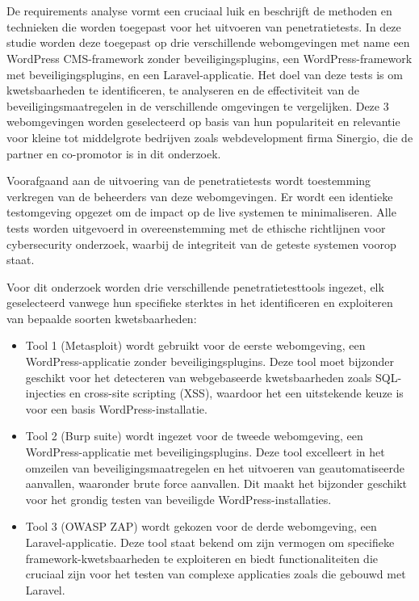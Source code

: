 \section{}
De requirements analyse vormt een cruciaal luik en beschrijft de methoden en technieken die worden toegepast 
voor het uitvoeren van penetratietests. In deze studie worden deze toegepast op drie 
verschillende webomgevingen met name een WordPress CMS-framework zonder beveiligingsplugins, een WordPress-framework met 
beveiligingsplugins, en een Laravel-applicatie. Het doel van deze tests is om kwetsbaarheden te identificeren, te 
analyseren en de effectiviteit van de beveiligingsmaatregelen in de verschillende omgevingen te vergelijken.
Deze 3 webomgevingen worden geselecteerd op basis van hun populariteit en relevantie voor kleine tot middelgrote bedrijven 
zoals webdevelopment firma Sinergio, die de partner en co-promotor is in dit onderzoek.

Voorafgaand aan de uitvoering van de penetratietests wordt toestemming verkregen van de beheerders van deze 
webomgevingen. Er wordt een identieke testomgeving opgezet om de impact op de live systemen te minimaliseren. 
Alle tests worden uitgevoerd in overeenstemming met de ethische richtlijnen voor cybersecurity onderzoek, 
waarbij de integriteit van de geteste systemen voorop staat.

Voor dit onderzoek worden drie verschillende penetratietesttools ingezet, elk geselecteerd vanwege hun 
specifieke sterktes in het identificeren en exploiteren van bepaalde soorten kwetsbaarheden:

\begin{itemize}
    \item Tool 1 (Metasploit) wordt gebruikt voor de eerste webomgeving, een WordPress-applicatie zonder 
    beveiligingsplugins. Deze tool moet bijzonder geschikt voor het detecteren van webgebaseerde kwetsbaarheden 
    zoals SQL-injecties en cross-site scripting (XSS), waardoor het een uitstekende keuze is voor 
    een basis WordPress-installatie.
    \item Tool 2 (Burp suite) wordt ingezet voor de tweede webomgeving, een WordPress-applicatie met beveiligingsplugins. 
    Deze tool excelleert in het omzeilen van beveiligingsmaatregelen en het uitvoeren van geautomatiseerde 
    aanvallen, waaronder brute force aanvallen. Dit maakt het bijzonder geschikt voor het grondig 
    testen van beveiligde WordPress-installaties.
    \item Tool 3 (OWASP ZAP) wordt gekozen voor de derde webomgeving, een Laravel-applicatie. Deze tool staat 
    bekend om zijn vermogen om specifieke framework-kwetsbaarheden te exploiteren en biedt functionaliteiten 
    die cruciaal zijn voor het testen van complexe applicaties zoals die gebouwd met Laravel.
\end{itemize}

